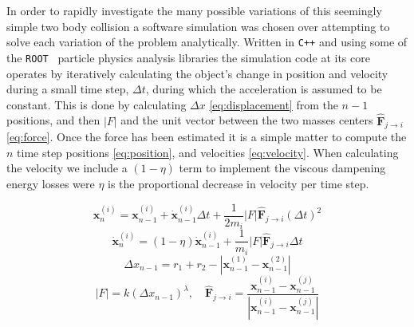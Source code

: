 \documentclass[aps,prl,floatfix,preprint,nofootinbib]{revtex4}
\begin{document}
In order to rapidly investigate the many possible variations of this seemingly simple two body collision a software simulation was chosen over attempting to solve each variation of the problem analytically. Written in \texttt{C++} and using some of the \texttt{ROOT}~\cite{ref_root} particle physics analysis libraries the simulation code at its core operates by iteratively calculating the object's change in position and velocity during a small time step, $\Delta t$, during which the acceleration is assumed to be constant. This is done by calculating $\Delta x$ \eqref{eq:displacement} from the $n-1$ positions, and then $\left|F\right|$ and the unit vector between the two masses centers $\mathbf{\hat{F}}_{j\rightarrow i}$ \eqref{eq:force}. Once the force has been estimated it is a simple matter to compute the $n$ time step positions \eqref{eq:position}, and velocities \eqref{eq:velocity}. When calculating the velocity we include a $\left(1-\eta\right)$ term to implement the viscous dampening energy losses were $\eta$ is the proportional decrease in velocity per time step.

\begin{equation}\label{eq:position}
  \mathbf{x}^{(i)}_{n} = \mathbf{x}^{(i)}_{n-1} + \dot{\mathbf{x}}^{(i)}_{n-1} \Delta t + \frac{1}{2m_i} \left| F \right| \mathbf{\hat{F}}_{j\rightarrow i} \left(\Delta t\right)^2
\end{equation}
\begin{equation}\label{eq:velocity}
  \dot{\mathbf{x}}^{(i)}_{n} = (1-\eta)\dot{\mathbf{x}}^{(i)}_{n-1} + \frac{1}{m_i} \left| F \right| \mathbf{\hat{F}}_{j\rightarrow i} \Delta t
\end{equation}
\begin{equation}\label{eq:displacement}
  \Delta x_{n-1} = r_1 + r_2 - \left| \mathbf{x}^{(1)}_{n-1}-\mathbf{x}^{(2)}_{n-1} \right|
\end{equation}
\begin{equation}\label{eq:force}
  \left| F \right| = k \left(\Delta x_{n-1}\right)^{\lambda},\quad \mathbf{\hat{F}}_{j\rightarrow i} = \frac{\mathbf{x}^{(i)}_{n-1}-\mathbf{x}^{(j)}_{n-1}}{\left|\mathbf{x}^{(i)}_{n-1}-\mathbf{x}^{(j)}_{n-1}\right|}
\end{equation}
\end{document}
